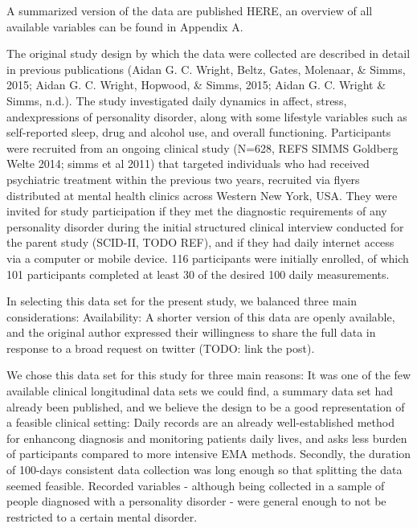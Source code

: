 \documentclass[
  english,
  man]{apa6}
\begin{document}
A summarized version of the data are published HERE, an overview of all available variables can be found in Appendix A.

The original study design by which the data were collected are described in detail in previous publications (Aidan G. C. Wright, Beltz, Gates, Molenaar, \& Simms, 2015; Aidan G. C. Wright, Hopwood, \& Simms, 2015; Aidan G. C. Wright \& Simms, n.d.). The study investigated daily dynamics in affect, stress, andexpressions of personality disorder, along with some lifestyle variables such as self-reported sleep, drug and alcohol use, and overall functioning. Participants were recruited from an ongoing clinical study (N=628, REFS SIMMS Goldberg Welte 2014; simms et al 2011) that targeted individuals who had received psychiatric treatment within the previous two years, recruited via flyers distributed at mental health clinics across Western New York, USA. They were invited for study participation if they met the diagnostic requirements of any personality disorder during the initial structured clinical interview conducted for the parent study (SCID-II, TODO REF), and if they had daily internet access via a computer or mobile device. 116 participants were initially enrolled, of which 101 participants completed at least 30 of the desired 100 daily measurements.

In selecting this data set for the present study, we balanced three main considerations: Availability: A shorter version of this data are openly available, and the original author expressed their willingness to share the full data in response to a broad request on twitter (TODO: link the post).

We chose this data set for this study for three main reasons: It was one of the few available clinical longitudinal data sets we could find, a summary data set had already been published, and we believe the design to be a good representation of a feasible clinical setting: Daily records are an already well-established method for enhancong diagnosis and monitoring patients daily lives, and asks less burden of participants compared to more intensive EMA methods. Secondly, the duration of 100-days consistent data collection was long enough so that splitting the data seemed feasible. Recorded variables - although being collected in a sample of people diagnosed with a personality disorder - were general enough to not be restricted to a certain mental disorder.
\end{document}
